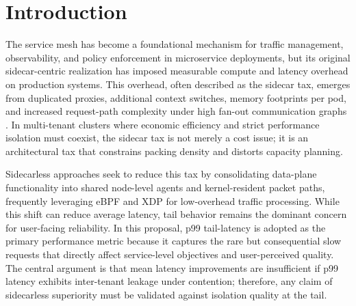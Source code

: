 \section{Introduction}
The service mesh has become a foundational mechanism for traffic management, observability, and policy enforcement in microservice deployments, but its original sidecar-centric realization has imposed measurable compute and latency overhead on production systems. This overhead, often described as the sidecar tax, emerges from duplicated proxies, additional context switches, memory footprints per pod, and increased request-path complexity under high fan-out communication graphs \cite{envoyDataPlaneOverhead,serviceMeshPerfStudies}. In multi-tenant clusters where economic efficiency and strict performance isolation must coexist, the sidecar tax is not merely a cost issue; it is an architectural tax that constrains packing density and distorts capacity planning.

Sidecarless approaches seek to reduce this tax by consolidating data-plane functionality into shared node-level agents and kernel-resident packet paths, frequently leveraging eBPF and XDP for low-overhead traffic processing. While this shift can reduce average latency, tail behavior remains the dominant concern for user-facing reliability. In this proposal, p99 tail-latency is adopted as the primary performance metric because it captures the rare but consequential slow requests that directly affect service-level objectives and user-perceived quality. The central argument is that mean latency improvements are insufficient if p99 latency exhibits inter-tenant leakage under contention; therefore, any claim of sidecarless superiority must be validated against isolation quality at the tail.
